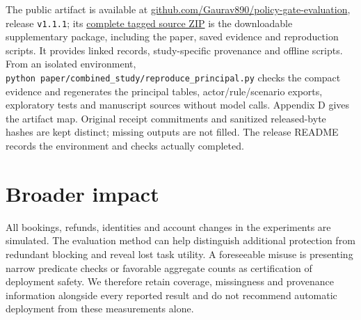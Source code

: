 The public artifact is available at
\href{https://github.com/Gaurav890/policy-gate-evaluation}{github.com/Gaurav890/policy-gate-evaluation},
release \texttt{v1.1.1}; its
\href{https://github.com/Gaurav890/policy-gate-evaluation/archive/refs/tags/v1.1.1.zip}{complete
tagged source ZIP} is the downloadable supplementary package, including
the paper, saved evidence and reproduction scripts. It provides linked
records, study-specific provenance and offline scripts. From an isolated
environment,
\texttt{python\ paper/combined\_study/reproduce\_principal.py} checks
the compact evidence and regenerates the principal tables,
actor/rule/scenario exports, exploratory tests and manuscript sources
without model calls. Appendix D gives the artifact map. Original receipt
commitments and sanitized released-byte hashes are kept distinct;
missing outputs are not filled. The release README records the
environment and checks actually completed.

\section*{Broader impact}\label{broader-impact}

All bookings, refunds, identities and account changes in the experiments
are simulated. The evaluation method can help distinguish additional
protection from redundant blocking and reveal lost task utility. A
foreseeable misuse is presenting narrow predicate checks or favorable
aggregate counts as certification of deployment safety. We therefore
retain coverage, missingness and provenance information alongside every
reported result and do not recommend automatic deployment from these
measurements alone.
